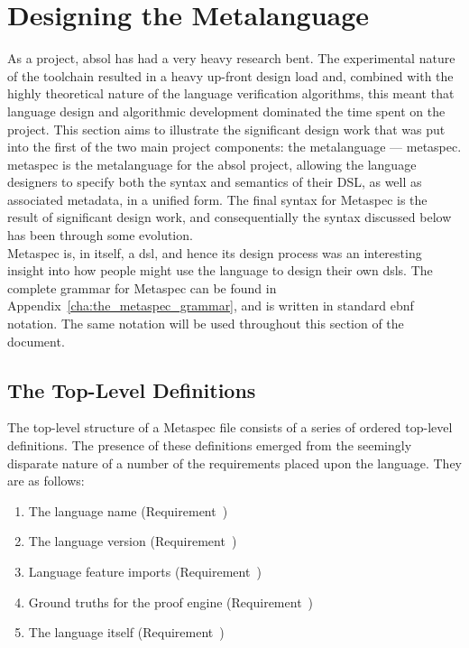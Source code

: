 \chapter{Designing the Metalanguage} %
\label{cha:designing_the_metalanguage}
As a project, \gls{absol} has had a very heavy research bent. 
The experimental nature of the toolchain resulted in a heavy up-front design load and, combined with the highly theoretical nature of the language verification algorithms, this meant that language design and algorithmic development dominated the time spent on the project.
This section aims to illustrate the significant design work that was put into the first of the two main project components: the metalanguage --- \gls{metaspec}. \\

\gls{metaspec} is the metalanguage for the \gls{absol} project, allowing the language designers to specify both the syntax and semantics of their DSL, as well as associated metadata, in a unified form. 
The final syntax for Metaspec is the result of significant design work, and consequentially the syntax discussed below has been through some evolution. \\

Metaspec is, in itself, a \gls{dsl}, and hence its design process was an interesting insight into how people might use the language to design their own \glspl{dsl}. 
The complete grammar for Metaspec can be found in Appendix~\ref{cha:the_metaspec_grammar}, and is written in standard \gls{ebnf} notation. 
The same notation will be used throughout this section of the document. 

\section{The Top-Level Definitions} %
\label{sec:the_top_level_definitions}
The top-level structure of a Metaspec file consists of a series of ordered top-level definitions.
The presence of these definitions emerged from the seemingly disparate nature of a number of the requirements placed upon the language.
They are as follows:
\begin{enumerate}
    \item The language name (Requirement~)
    \item The language version (Requirement~)
    \item Language feature imports (Requirement~)
    \item Ground truths for the proof engine (Requirement~)
    \item The language itself (Requirement~)
\end{enumerate}

